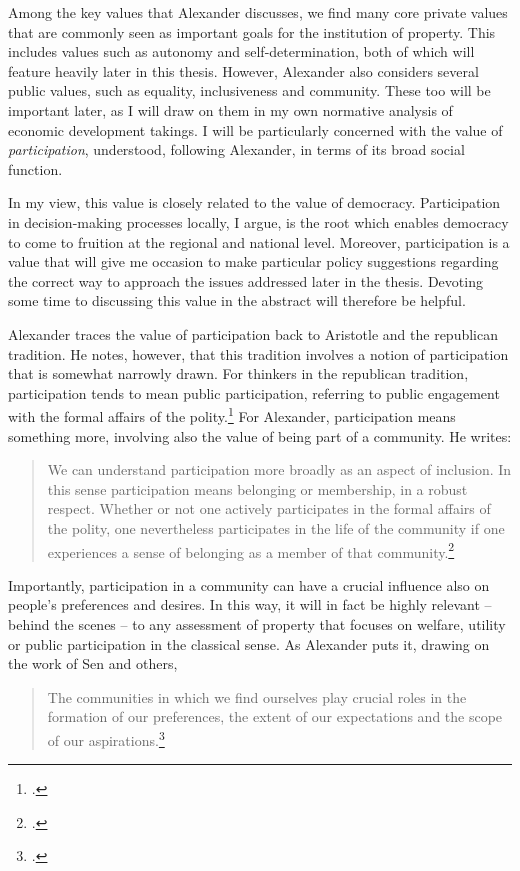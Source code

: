 Among the key values that Alexander discusses, we find many core private values that are commonly seen as important goals for the institution of property. This includes values such as autonomy and self-determination, both of which will feature heavily later in this thesis. However, Alexander also considers several public values, such as equality, inclusiveness and community. These too will be important later, as I will draw on them in my own normative analysis of economic development takings. I will be particularly concerned with the value of {\it participation}, understood, following Alexander, in terms of its broad social function.

In my view, this value is closely related to the value of democracy. Participation in decision-making processes locally, I argue, is the root which enables democracy to come to fruition at the regional and national level. Moreover, participation is a value that will give me occasion to make particular policy suggestions regarding the correct way to approach the issues addressed later in the thesis. Devoting some time to discussing this value in the abstract will therefore be helpful.

Alexander traces the value of participation back to Aristotle and the republican tradition. He notes, however, that this tradition involves a notion of participation that is somewhat narrowly drawn. For thinkers in the republican tradition, participation tends to mean public participation, referring to public engagement with the formal affairs of the polity.\footcite[1275]{alexander14} For Alexander, participation means something more, involving also the value of being part of a community. He writes:

\begin{quote}
We can understand participation more broadly as an aspect of inclusion. In this sense participation means belonging or membership, in a robust respect. Whether or not one actively participates in the formal affairs of the polity, one nevertheless participates in the life of the community if one experiences a sense of belonging as a member of that community.\footcite[1275]{alexander14}
\end{quote}

Importantly, participation in a community can have a crucial influence also on people's preferences and desires. In this way, it will in fact be highly relevant -- behind the scenes -- to any assessment of property that focuses on welfare, utility or public participation in the classical sense. As Alexander puts it, drawing on the work of Sen and others,
\begin{quote}
The communities in which we find ourselves play crucial roles in the formation of our preferences, the extent of our expectations and the scope of our aspirations.\footcite[140]{alexander09}
\end{quote}


